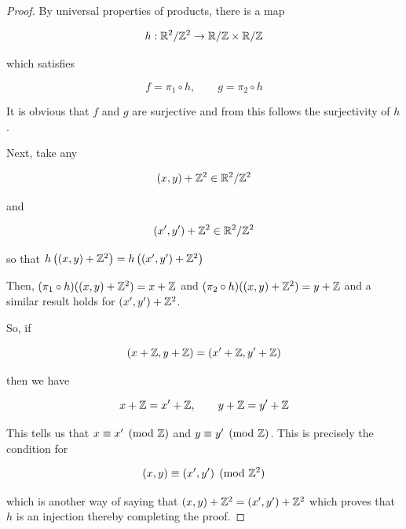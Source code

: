\documentclass{article}
\begin{document}
\begin{proof}
  By universal properties of products, there is a map 

  \[
    h: {{\displaystyle \mathbb{R}^{2}}}/{{\displaystyle \mathbb{Z}^{2}}} \to {{\displaystyle \mathbb{R}}}/{{\displaystyle \mathbb{Z}}}\times {{\displaystyle \mathbb{R}}}/{{\displaystyle \mathbb{Z}}}
  \]

  which satisfies 

  \[
    f = \pi_{1}\circ h, \qquad g = \pi_{2}\circ h
  \]

  It is obvious that \(f\) and \(g\) are surjective and from this follows the surjectivity of \(h\).


  Next, take any 

  \[
    (x,y) + \mathbb{Z}^{2} \in {{\displaystyle \mathbb{R}^{2}}}/{{\displaystyle \mathbb{Z}^{2}}}
  \]

  and 

  \[
    (x', y') + \mathbb{Z}^{2} \in {{\displaystyle \mathbb{R}^{2}}}/{{\displaystyle \mathbb{Z}^{2}}}
  \]

  so that \(h\left((x,y) + \mathbb{Z}^{2}\right) = h\left((x',y') + \mathbb{Z}^{2}\right)\)

  Then, \((\pi_1\circ h) ((x,y) + \mathbb{Z}^{2}) = x+\mathbb{Z}\) and \((\pi_2 \circ h) ((x,y)+\mathbb{Z}^{2}) = y+\mathbb{Z}\)
  and a similar result holds for \((x',y')+\mathbb{Z}^{2}\).

  So, if 

  \[
    (x+\mathbb{Z}, y+\mathbb{Z}) = (x'+\mathbb{Z}, y'+\mathbb{Z})
  \]
  
  then we have 

  \[
    x+\mathbb{Z} = x'+\mathbb{Z}, \qquad y+\mathbb{Z} = y'+\mathbb{Z} 
  \]

  This tells us that \(x \equiv x' \pmod{\mathbb{Z}}\) and \(y \equiv y' \pmod{\mathbb{Z}}\). This is 
  precisely the condition for 

  \[
    (x,y) \equiv (x', y') \pmod{\mathbb{Z}^{2}}
  \]

  which is another way of saying that \((x,y)+\mathbb{Z}^{2} = (x',y')+\mathbb{Z}^{2}\) which 
  proves that \(h\) is an injection thereby completing the proof.
\end{proof}
\end{document}
